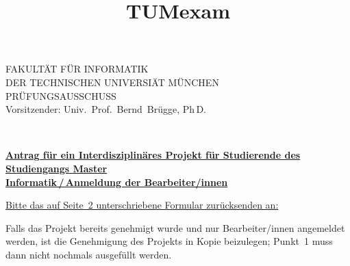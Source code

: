 \documentclass[german,11pt]{netforms}
\title{TUMexam}{TUMexam}
\begin{document}
	\begin{minipage}{.2\textwidth}%
		\centering
	\end{minipage}%
	\begin{minipage}{.6\textwidth}%
		\centering
		\huge\textsc{FAKULT\"AT F\"UR INFORMATIK}\large\\[-.2ex]
		\textsc{DER TECHNISCHEN UNIVERSI\"AT M\"UNCHEN}\\[-.2ex]
		\textsc{PR\"UFUNGSAUSSCHUSS}\\[-.2ex]
		Vorsitzender: Univ.~Prof.~Bernd~Br\"ugge, Ph\,D.
	\end{minipage}%
	\begin{minipage}{.2\textwidth}%
		\centering
	\end{minipage}\\[1ex]

	\begin{center}
		\textbf{%
			\large
			\underline{Antrag f\"ur ein Interdisziplin\"ares Projekt f\"ur
			Studierende des Studiengangs Master}\\[.2ex]
			\underline{Informatik\,/\,Anmeldung der Bearbeiter/innen}
		}
	\end{center}

	\vspace{1ex}
	{%
		\footnotesize
		\underline{Bitte das auf Seite~2 unterschriebene Formular
		zur\"ucksenden an:}
	}

	\vspace{.5ex}
	\hspace{.5ex}

	\vspace{\baselineskip}
	Falls das Projekt bereits genehmigt wurde und nur Bearbeiter/innen
	angemeldet werden, ist die Genehmigung des Projekts in Kopie beizulegen;
	Punkt~1 muss dann nicht nochmals ausgef\"ullt werden.
\end{document}
